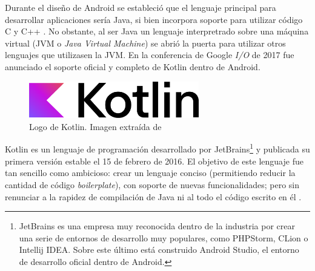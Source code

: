             Durante el diseño de Android se estableció que el lenguaje principal para desarrollar aplicaciones sería 
            Java, si bien incorpora soporte para utilizar código C y C++ \cite{android_developers_como_nodate}. No
            obstante, al ser Java un lenguaje interpretrado sobre una máquina virtual (JVM o \textit{Java Virtual
            Machine}) se abrió la puerta para  utilizar otros lenguajes que utilizasen la JVM. En la conferencia de 
            Google \textit{I/O} de 2017 fue anunciado el soporte oficial y completo 
            de Kotlin dentro de Android. 

            \begin{figure}[h]
                \centering
                \includegraphics[width=0.66\textwidth]{figures/Kotlin logo.png}
                \caption[Logo de Kotlin.]
                {Logo de Kotlin. Imagen extraída de \cite{noauthor_kotlin_nodate-1}}
                \label{figure:kotlin:logo}
            \end{figure}

            Kotlin es un lenguaje de programación desarrollado por JetBrains\footnote{JetBrains es una
            empresa muy reconocida dentro de la industria por crear una serie de entornos de desarrollo muy populares,
            como PHPStorm, CLion o Intellij IDEA. Sobre este último está construido Android Studio, el entorno de 
            desarrollo oficial dentro de Android.} y publicada su primera versión estable el 15 de febrero de 2016.
            El objetivo de este lenguaje fue tan sencillo como ambicioso: crear un lenguaje conciso (permitiendo reducir
            la cantidad de código \textit{boilerplate}), con soporte de nuevas funcionalidades; pero sin renunciar a la rapidez de
            compilación de Java ni al todo el código escrito en él 
            \cite{rao_k_history_nodate}. 

